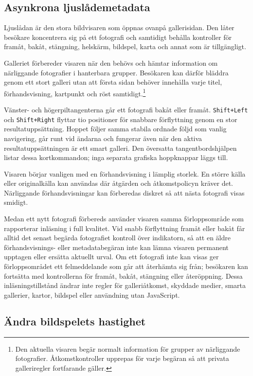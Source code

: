 \documentclass[11pt,a4paper]{article}
\newcommand{\codeword}[1]{\nolinkurl{#1}}
\begin{document}
\subsection{Asynkrona ljuslådemetadata}

Ljuslådan är den stora bildvisaren som öppnas ovanpå gallerisidan. Den låter
besökare koncentrera sig på ett fotografi och samtidigt behålla kontroller för
framåt, bakåt, stängning, helskärm, bildspel, karta och annat som är
tillgängligt.

Galleriet förbereder visaren när den behövs och hämtar information om
närliggande fotografier i hanterbara grupper. Besökaren kan därför bläddra genom
ett stort galleri utan att första sidan behöver innehålla varje titel,
förhandsvisning, kartpunkt och röst samtidigt.\footnote{Den aktuella visaren
begär normalt information för grupper av närliggande fotografier.
Åtkomstkontroller upprepas för varje begäran så att privata galleriregler
fortfarande gäller.}

Vänster- och högerpiltangenterna går ett fotografi bakåt eller framåt.
\codeword{Shift+Left} och \codeword{Shift+Right} flyttar tio positioner för
snabbare förflyttning genom en stor resultatuppsättning. Hoppet följer samma
stabila ordnade följd som vanlig navigering, går runt vid ändarna och fungerar
även när den aktiva resultatuppsättningen är ett smart galleri. Den översatta
tangentbordshjälpen listar dessa kortkommandon; inga separata grafiska
hoppknappar läggs till.

Visaren börjar vanligen med en förhandsvisning i lämplig storlek. En större
källa eller originalkälla kan användas där åtgärden och åtkomstpolicyn kräver
det. Närliggande förhandsvisningar kan förberedas diskret så att nästa fotografi
visas smidigt.

Medan ett nytt fotografi förbereds använder visaren samma förloppsområde som
rapporterar inläsning i full kvalitet. Vid snabb förflyttning framåt eller bakåt
får alltid det senast begärda fotografiet kontroll över indikatorn, så att en
äldre förhandsvisnings- eller metadatabegäran inte kan lämna visaren permanent
upptagen eller ersätta aktuellt urval. Om ett fotografi inte kan visas ger
förloppsområdet ett felmeddelande som går att återhämta sig från; besökaren kan
fortsätta med kontrollerna för framåt, bakåt, stängning eller återöppning. Dessa
inläsningstillstånd ändrar inte regler för galleriåtkomst, skyddade medier,
smarta gallerier, kartor, bildspel eller användning utan JavaScript.

\subsection{Ändra bildspelets hastighet}
\end{document}
